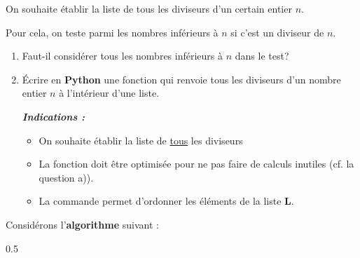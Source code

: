 \begin{boxexstheorieligne}
\eexo
\pagebreak[3]



\exo
On souhaite établir la liste de tous les diviseurs d'un certain entier $n$.

\smallskip
Pour cela, on teste parmi les nombres inférieurs à $n$ si c'est un diviseur de $n$.

\vspace{1mm}
\makeatletter
\begin{enumerate}[label=\alph*)]
\item Faut-il considérer tous les nombres inférieurs à $n$ dans le test?
\item Écrire en \textbf{Python} une fonction  qui renvoie tous les diviseurs d'un nombre entier $n$ à l'intérieur d'une liste.\par\nobreak\@nobreaktrue

\vspace{2mm}
\textit{\footnotesize\textbf{Indications :}}
\begin{minipage}[t]{0.9\textwidth}\footnotesize\itshape \begin{itemize}[leftmargin=*,itemsep=0mm,labelsep=1mm]
\item On souhaite établir la liste de \underline{tous} les diviseurs

\item La fonction doit être optimisée pour ne pas faire de calculs inutiles (cf. la question a)).

\item La commande  permet d'ordonner les éléments de la liste \textbf{L}.
\end{itemize}\end{minipage}
\end{enumerate}
\makeatother 







\eexo
\pagebreak[3]



\exo
Considérons l'{\bf algorithme} suivant :

\vspace{3mm}
\begin{center}
\begin{affichagealgorithme}{0.5}


\end{affichagealgorithme}
\end{center}
\end{boxexstheorieligne}

